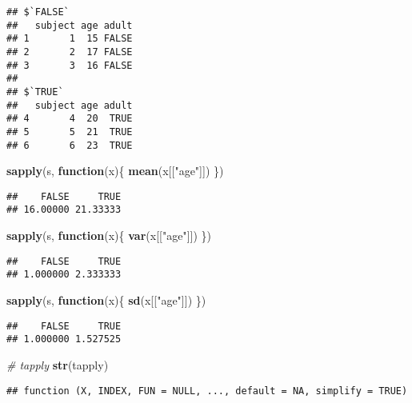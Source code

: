 \documentclass[
]{article}
\newenvironment{Shaded}{\begin{snugshade}}{\end{snugshade}}
\newcommand{\CommentTok}[1]{\textcolor[rgb]{0.56,0.35,0.01}{\textit{#1}}}
\newcommand{\ControlFlowTok}[1]{\textcolor[rgb]{0.13,0.29,0.53}{\textbf{#1}}}
\newcommand{\FunctionTok}[1]{\textcolor[rgb]{0.13,0.29,0.53}{\textbf{#1}}}
\newcommand{\NormalTok}[1]{#1}
\newcommand{\StringTok}[1]{\textcolor[rgb]{0.31,0.60,0.02}{#1}}
\begin{document}
\begin{verbatim}
## $`FALSE`
##   subject age adult
## 1       1  15 FALSE
## 2       2  17 FALSE
## 3       3  16 FALSE
## 
## $`TRUE`
##   subject age adult
## 4       4  20  TRUE
## 5       5  21  TRUE
## 6       6  23  TRUE
\end{verbatim}

\begin{Shaded}
\begin{Highlighting}[]
\FunctionTok{sapply}\NormalTok{(s, }\ControlFlowTok{function}\NormalTok{(x)\{}
\FunctionTok{mean}\NormalTok{(x[[}\StringTok{"age"}\NormalTok{]])}
\NormalTok{\})}
\end{Highlighting}
\end{Shaded}

\begin{verbatim}
##    FALSE     TRUE 
## 16.00000 21.33333
\end{verbatim}

\begin{Shaded}
\begin{Highlighting}[]
\FunctionTok{sapply}\NormalTok{(s, }\ControlFlowTok{function}\NormalTok{(x)\{}
\FunctionTok{var}\NormalTok{(x[[}\StringTok{"age"}\NormalTok{]])}
\NormalTok{\})}
\end{Highlighting}
\end{Shaded}

\begin{verbatim}
##    FALSE     TRUE 
## 1.000000 2.333333
\end{verbatim}

\begin{Shaded}
\begin{Highlighting}[]
\FunctionTok{sapply}\NormalTok{(s, }\ControlFlowTok{function}\NormalTok{(x)\{}
\FunctionTok{sd}\NormalTok{(x[[}\StringTok{"age"}\NormalTok{]])}
\NormalTok{\})}
\end{Highlighting}
\end{Shaded}

\begin{verbatim}
##    FALSE     TRUE 
## 1.000000 1.527525
\end{verbatim}

\begin{Shaded}
\begin{Highlighting}[]
\CommentTok{\# tapply}
\FunctionTok{str}\NormalTok{(tapply)}
\end{Highlighting}
\end{Shaded}

\begin{verbatim}
## function (X, INDEX, FUN = NULL, ..., default = NA, simplify = TRUE)
\end{verbatim}
\end{document}
